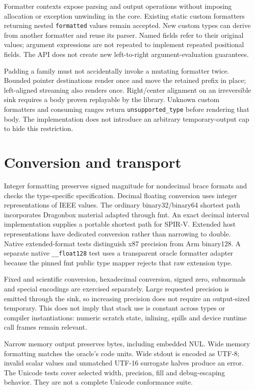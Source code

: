 \documentclass[11pt,letterpaper]{article}
\begin{document}
Formatter contexts expose parsing and output operations without imposing
allocation or exception unwinding in the core. Existing static custom
formatters returning nested \texttt{formatted} values remain accepted.
New custom types can derive from another formatter and reuse its parser.
Named fields refer to their original values; argument expressions are not
repeated to implement repeated positional fields. The API does not create
new left-to-right argument-evaluation guarantees.

Padding a family must not accidentally invoke a mutating formatter twice.
Bounded pointer destinations render once and move the retained prefix in place;
left-aligned streaming also renders once. Right/center alignment on an
irreversible sink requires a body proven replayable by the library. Unknown
custom formatters and consuming ranges return \texttt{unsupported\_type} before
rendering that body. The implementation does not introduce an arbitrary
temporary-output cap to hide this restriction.

\section{Conversion and transport}

Integer formatting preserves signed magnitude for nondecimal brace formats
and checks the type-specific specification. Decimal floating conversion uses
integer representations of IEEE values. The ordinary binary32/binary64
shortest path incorporates Dragonbox material adapted through
fmt\cite{dragonbox,fmt-source}. An exact decimal interval implementation supplies
a portable shortest path for SPIR-V. Extended host representations have
dedicated conversion rather than narrowing to double. Native extended-format
tests distinguish x87 precision from Arm binary128. A separate native
\texttt{\_\_float128} test uses a transparent oracle formatter adapter because
the pinned fmt public type mapper rejects that raw extension type.

Fixed and scientific conversion, hexadecimal conversion, signed zero,
subnormals and special encodings are exercised separately. Large requested
precision is emitted through the sink, so increasing precision does not
require an output-sized temporary. This does not imply that stack use is
constant across types or compiler instantiations: numeric scratch state,
inlining, spills and device runtime call frames remain relevant.

Narrow memory output preserves bytes, including embedded NUL. Wide memory
formatting matches the oracle's code units. Wide stdout is encoded as UTF-8;
invalid scalar values and unmatched UTF-16 surrogate halves produce an error.
The Unicode tests cover selected width, precision, fill and debug-escaping
behavior. They are not a complete Unicode conformance suite.
\end{document}
